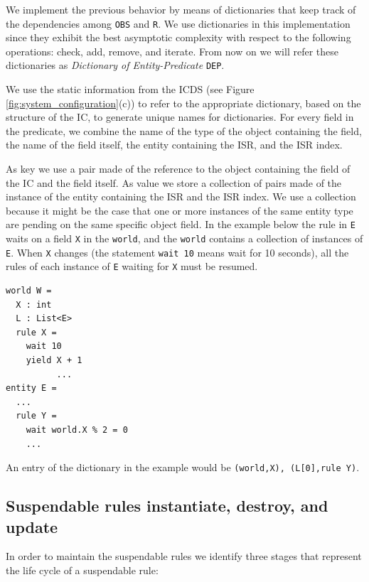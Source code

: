We implement the previous behavior by means of dictionaries that keep track of the dependencies among \texttt{OBS} and \texttt{R}. We use dictionaries in this implementation since they exhibit the best asymptotic complexity with respect to the following operations: check, add, remove, and iterate. From now on we will refer these dictionaries as \emph{Dictionary of Entity-Predicate} \texttt{DEP}.

We use the static information from the ICDS (see Figure \ref{fig:system_configuration}(c)) to refer to the appropriate dictionary, based on the structure of the IC, to generate unique names for dictionaries. For every field in the predicate, we combine the name of the type of the object containing the field, the name of the field itself, the entity containing the ISR, and the ISR index.

As key we use a pair made of the reference to the object containing the field of the IC and the field itself. As value we store a collection of pairs made of the instance of the entity containing the ISR and the ISR index. We use a collection because it might be the case that one or more instances of the same entity type are pending on the same specific object field. In the example below the rule in \texttt{E} waits on a field \texttt{X} in the \texttt{world}, and the \texttt{world} contains a collection of instances of \texttt{E}. When \texttt{X} changes (the statement \texttt{wait 10} means wait for 10 seconds), all the rules of each instance of \texttt{E} waiting for \texttt{X} must be resumed.

\begin{lstlisting}
world W = 
  X : int
  L : List<E>
  rule X = 
    wait 10 
    yield X + 1
          ...
entity E = 
  ...
  rule Y = 
    wait world.X % 2 = 0
    ...
\end{lstlisting}

An entry of the dictionary in the example would be \texttt{(world,X), (L[0],rule Y)}.

\subsection{Suspendable rules instantiate, destroy, and update}

In order to maintain the suspendable rules we identify three stages that represent the life cycle of a suspendable rule:

